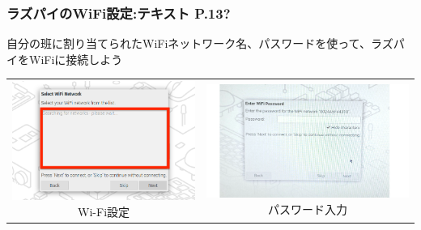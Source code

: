 \documentclass[dvipdfmx]{beamer}
\begin{document}
\begin{frame}[fragile]
	\frametitle{ラズパイのWiFi設定:テキスト P.13?~~~}

	自分の班に割り当てられたWiFiネットワーク名、パスワードを使って、ラズパイをWiFiに接続しよう
	\vfill
	\begin{center}
	\begin{tabular}{cc}
		\begin{minipage}{0.32\textwidth}
                {\upshape
                  \includegraphics[width=\textwidth]{sw_image06kai.png}
                  \newline
                  Wi-Fi設定}
		\end{minipage}&
		\begin{minipage}{0.32\textwidth}
                          {\upshape
                            \includegraphics[width=\textwidth]{pswd_image_0404.png}
                            \newline
                            パスワード入力}
                        \end{minipage}

	\end{tabular}
	\end{center}


\end{frame}
\end{document}
